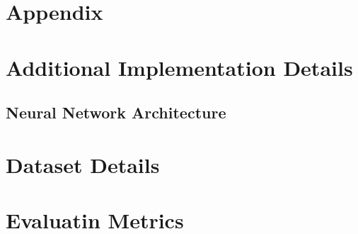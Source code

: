 \appendix
\section*{Appendix}
\section{Additional Implementation Details}
\subsection{Neural Network Architecture}
\subsection{}
\section{Dataset Details}
\section{Evaluatin Metrics}